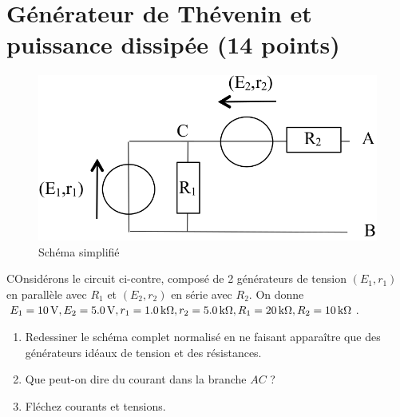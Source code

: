 \documentclass[10pt,a4paper]{article}
\begin{document}
\newpage

\section{Générateur de Thévenin et puissance dissipée (14 points)}
\begin{figure}
    \vspace*{-25pt}
    \raggedleft
    \includegraphics[width=\linewidth]{th_solo.png}
    \captionsetup{justification=centering}
    \caption{Schéma simplifié}
    \label{fig:solo}
\end{figure}
COnsidérons le circuit ci-contre, composé de 2 générateurs de tension 
$(E_1, r_1)$ en parallèle avec $R_1$ et $(E_2, r_2)$ en série avec $R_2$. On
donne $E_1 = \SI{10}{V}, E_2 = \SI{5.0}{V}, r_1= \SI{1.0}{k\Omega}, r_2 =
\SI{5.0}{k\Omega}, R_1 = \SI{20}{k\Omega}, R_2 = \SI{10}{k\Omega}$.

\begin{enumerate}[label=\color{brandeisblue}\arabic*)]
    \item Redessiner le schéma complet normalisé en ne faisant apparaître que
        des générateurs idéaux de tension et des résistances.
        \vspace{3cm}
    \item Que peut-on dire du courant dans la branche $AC$ ?
        \vspace{1cm}
    \item Fléchez courants et tensions.
\end{enumerate}
\end{document}
